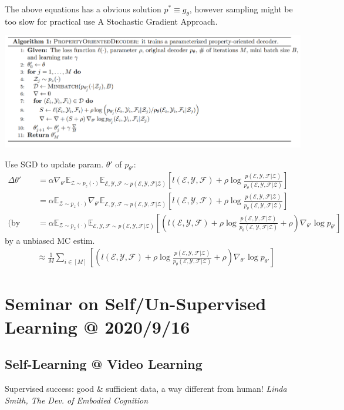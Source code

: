 \documentclass{article}
\begin{document}
    The above equations has a obvious solution $p^*\equiv g_\theta$, however sampling might be too slow for practical use \trarr A Stochastic Gradient Approach.

    \centerline{\includegraphics[width=0.85\paperwidth]{nevae-alg1.PNG}}
    Use SGD to update param. $\theta'$ of $p_{\theta'}$:
    \begin{align}
        \Delta \theta' &= \alpha \nabla_{\theta'} \mathbb E_{\mathcal Z\sim p_z(\cdot)}\mathbb E_{\mathcal{E,Y,F}\sim p(\mathcal{E,Y,F}|\mathcal Z)}[l(\mathcal{E,Y,F})+\rho \log \frac{p(\mathcal{E,Y,F}|\mathcal Z)}{p_\theta (\mathcal{E,Y,F}|\mathcal Z)}]\\
        &= \alpha \mathbb E_{\mathcal Z\sim p_z(\cdot)} \nabla_{\theta'} \mathbb E_{\mathcal{E,Y,F}\sim p(\mathcal{E,Y,F}|\mathcal Z)}[l(\mathcal{E,Y,F})+\rho \log \frac{p(\mathcal{E,Y,F}|\mathcal Z)}{p_\theta (\mathcal{E,Y,F}|\mathcal Z)}]\\
        \text{(by log-deriv. trick) } &= \alpha \mathbb E_{\mathcal Z\sim p_z(\cdot)} \mathbb E_{\mathcal{E,Y,F}\sim p(\mathcal{E,Y,F}|\mathcal Z)}\left[
            (l(\mathcal{E,Y,F})+\rho \log \frac{p(\mathcal{E,Y,F}|\mathcal Z)}{p_\theta (\mathcal{E,Y,F}|\mathcal Z)}+\rho)\nabla_{\theta'} \log p_{\theta'}
        \right]
    \end{align}
    by a unbiased MC estim.
    \begin{align}
        &\approx \frac {1}{M} \sum_{i\in[M]}
        \left[
            (l(\mathcal{E,Y,F})+\rho \log \frac{p(\mathcal{E,Y,F}|\mathcal Z)}{p_\theta (\mathcal{E,Y,F}|\mathcal Z)}+\rho)\nabla_{\theta'} \log p_{\theta'}
        \right]
    \end{align}


\section{Seminar on Self/Un-Supervised Learning @ 2020/9/16}
\subsection{Self-Learning @ Video Learning}
    Supervised success: good \& sufficient data, a way different from human! \tRarr \textit{Linda Smith, The Dev. of Embodied Cognition}
\end{document}
